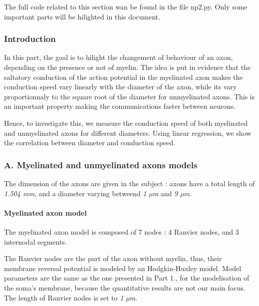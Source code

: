 \documentclass[]{article}
\let\oldparagraph\paragraph
\renewcommand{\paragraph}[1]{\oldparagraph{#1}\mbox{}}
\begin{document}
The full code related to this section wan be found in the file np2.py.
Only some important parts will be hilighted in this document.

\hypertarget{introduction-1}{%
\subsubsection{Introduction}\label{introduction-1}}

In this part, the goal is to hilight the changement of behaviour of an
axon, depending on the presence or not of myelin. The idea is put in
evidence that the saltatory conduction of the action potential in the
myelinated axon makes the conduction speed vary linearly with the
diameter of the axon, while its vary proportionnaly to the square root
of the diameter for unmyelinated axons. This is an important property
making the communications faster between neurons.

Hence, to investigate this, we measure the conduction speed of both
myelinated and unmyelinated axons for different diameters. Using linear
regression, we show the correlation between diameter and conduction
speed.

\hypertarget{a.-myelinated-and-unmyelinated-axons-models}{%
\subsubsection{A. Myelinated and unmyelinated axons
models}\label{a.-myelinated-and-unmyelinated-axons-models}}

The dimension of the axons are given in the subject : axons have a total
length of \emph{1.504 mm}, and a diameter varying betweend \emph{1 µm}
and \emph{9 µm}.

\hypertarget{myelinated-axon-model}{%
\paragraph{Myelinated axon model}\label{myelinated-axon-model}}

The myelinated axon model is composed of 7 nodes : 4 Ranvier nodes, and
3 internodal segments.

The Ranvier nodes are the part of the axon without myelin, thus, their
membrane reversal potential is modeled by an Hodgkin-Huxley model. Model
parameters are the same as the one presented in Part 1., for the
modelisation of the soma's membrane, because the quantitative results
are not our main focus. The length of Ranvier nodes is set to \emph{1
µm}.
\end{document}
